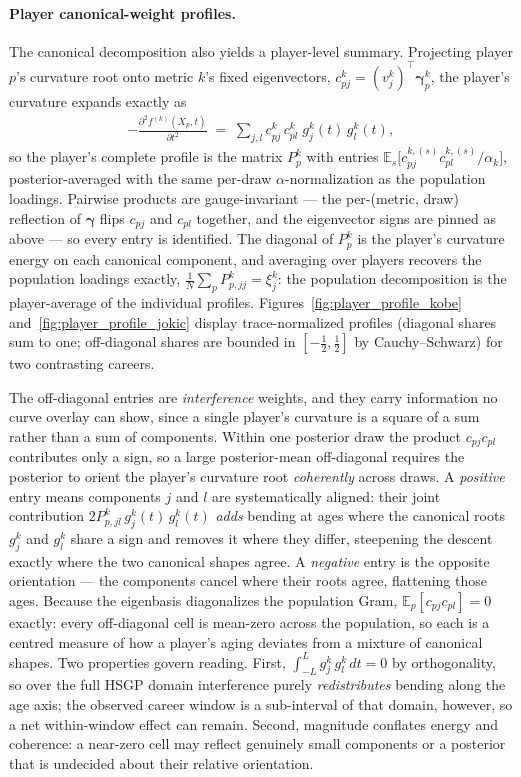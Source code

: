 \paragraph{Player canonical-weight profiles.}
The canonical decomposition also yields a player-level summary.  Projecting player $p$'s curvature root onto metric $k$'s fixed eigenvectors, $c^k_{pj} = (v^k_j)^\top \boldsymbol\gamma^k_p$, the player's curvature expands exactly as
\begin{align}
\label{eq:player_profile}
  -\frac{\partial^2 f^{(k)}(X_p, t)}{\partial t^2} \;=\; \sum_{j,l} c^k_{pj}\, c^k_{pl}\; g^k_j(t)\, g^k_l(t),
\end{align}
so the player's complete profile is the matrix $P^k_p$ with entries $\mathbb{E}_s\bigl[c^{k,(s)}_{pj} c^{k,(s)}_{pl} / \alpha_k\bigr]$, posterior-averaged with the same per-draw $\alpha$-normalization as the population loadings.  Pairwise products are gauge-invariant --- the per-(metric, draw) reflection of $\boldsymbol\gamma$ flips $c_{pj}$ and $c_{pl}$ together, and the eigenvector signs are pinned as above --- so every entry is identified.  The diagonal of $P^k_p$ is the player's curvature energy on each canonical component, and averaging over players recovers the population loadings exactly, $\tfrac{1}{N}\sum_p P^k_{p,jj} = \xi^k_j$: the population decomposition is the player-average of the individual profiles.  Figures~\ref{fig:player_profile_kobe} and~\ref{fig:player_profile_jokic} display trace-normalized profiles (diagonal shares sum to one; off-diagonal shares are bounded in $[-\tfrac{1}{2}, \tfrac{1}{2}]$ by Cauchy--Schwarz) for two contrasting careers.

The off-diagonal entries are \emph{interference} weights, and they carry information no curve overlay can show, since a single player's curvature is a square of a sum rather than a sum of components.  Within one posterior draw the product $c_{pj} c_{pl}$ contributes only a sign, so a large posterior-mean off-diagonal requires the posterior to orient the player's curvature root \emph{coherently} across draws.  A \emph{positive} entry means components $j$ and $l$ are systematically aligned: their joint contribution $2 P^k_{p,jl}\, g^k_j(t)\, g^k_l(t)$ \emph{adds} bending at ages where the canonical roots $g^k_j$ and $g^k_l$ share a sign and removes it where they differ, steepening the descent exactly where the two canonical shapes agree.  A \emph{negative} entry is the opposite orientation --- the components cancel where their roots agree, flattening those ages.  Because the eigenbasis diagonalizes the population Gram, $\mathbb{E}_p[c_{pj} c_{pl}] = 0$ exactly: every off-diagonal cell is mean-zero across the population, so each is a centred measure of how a player's aging deviates from a mixture of canonical shapes.  Two properties govern reading.  First, $\int_{-L}^{L} g^k_j\, g^k_l \, dt = 0$ by orthogonality, so over the full HSGP domain interference purely \emph{redistributes} bending along the age axis; the observed career window is a sub-interval of that domain, however, so a net within-window effect can remain.  Second, magnitude conflates energy and coherence: a near-zero cell may reflect genuinely small components or a posterior that is undecided about their relative orientation.

